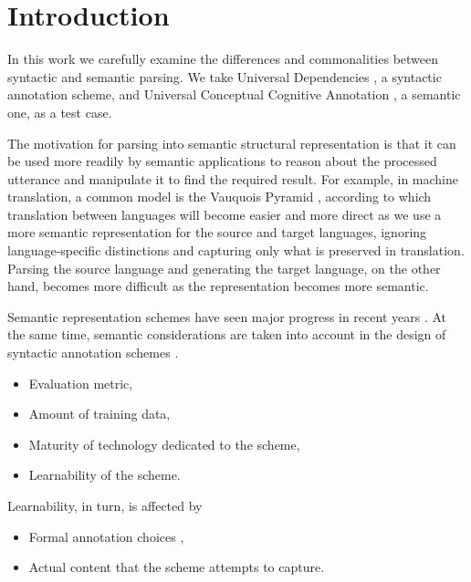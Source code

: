 \documentclass[11pt,a4paper]{article}
\begin{document}





\section{Introduction}\label{sec:introduction}

In this work we carefully examine the differences and commonalities
between syntactic and semantic parsing.
We take Universal Dependencies \cite[UD; ][]{nivre2016universal},
a syntactic annotation scheme,
and Universal Conceptual Cognitive Annotation \cite[UCCA; ][]{abend2013universal},
a semantic one, as a test case.

The motivation for parsing into semantic structural representation is that it can be used more readily
by semantic applications to reason about the processed utterance and manipulate it to find the required
result.
For example, in machine translation, a common model is the Vauquois Pyramid 
\cite{vauquois1968survey},
according to which translation between languages will become easier and more direct as we use
a more semantic representation for the source and target languages,
ignoring language-specific distinctions and capturing only what is preserved in translation.
Parsing the source language and generating the target language, on the other hand, becomes more
difficult as the representation becomes more semantic.

Semantic representation schemes have seen major progress in recent years \cite{abend2017state}.
At the same time, semantic considerations are taken into account in the design of syntactic annotation schemes
\cite{przepiorkowski2018arguments}.

\begin{itemize}
\item Evaluation metric,
\item Amount of training data,
\item Maturity of technology dedicated to the scheme,
\item Learnability of the scheme.
\end{itemize}

Learnability, in turn, is affected by
\begin{itemize}
\item Formal annotation choices \cite{Schwartz:12},
\item Actual content that the scheme attempts to capture.
\end{itemize}
\end{document}
